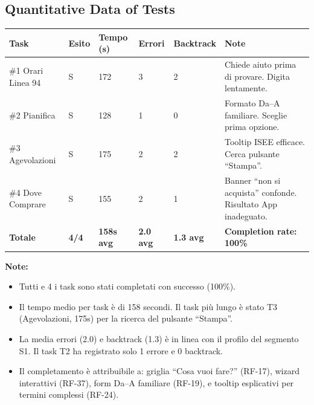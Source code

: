 \documentclass[11pt,a4paper]{article}
\begin{document}
\vspace{0.3cm}

\subsection{Quantitative Data of Tests}

\begin{tcolorbox}[colback=backgroundColor,colframe=borderColor,arc=2mm]
\small

\renewcommand{\arraystretch}{1.3}
\begin{tabular}{|L{1.5cm}|C{1.5cm}|C{1.5cm}|C{1.5cm}|C{1.5cm}|C{3.5cm}|}
\hline
{}
\textbf{Task} & \textbf{Esito} & \textbf{Tempo (s)} & \textbf{Errori} & \textbf{Backtrack} & \textbf{Note} \\
\hline
\#1 Orari Linea 94 & S & 172 & 3 & 2 & Chiede aiuto prima di provare. Digita lentamente. \\
\hline
\#2 Pianifica & S & 128 & 1 & 0 & Formato Da--A familiare. Sceglie prima opzione. \\
\hline
\#3 Agevolazioni & S & 175 & 2 & 2 & Tooltip ISEE efficace. Cerca pulsante ``Stampa''. \\
\hline
\#4 Dove Comprare & S & 155 & 2 & 1 & Banner ``non si acquista'' confonde. Risultato App inadeguato. \\
\hline
{}
\textbf{Totale} & \textbf{4/4} & \textbf{158s avg} & \textbf{2.0 avg} & \textbf{1.3 avg} & \textbf{Completion rate: 100\%} \\
\hline
\end{tabular}

\vspace{0.3cm}
\noindent\textbf{Note:}
\begin{itemize}
  \item Tutti e 4 i task sono stati completati con successo (100\%).
  \item Il tempo medio per task \`e di 158 secondi. Il task pi\`u lungo \`e stato T3 (Agevolazioni, 175s) per la ricerca del pulsante ``Stampa''.
  \item La media errori (2.0) e backtrack (1.3) \`e in linea con il profilo del segmento S1. Il task T2 ha registrato solo 1 errore e 0 backtrack.
  \item Il completamento \`e attribuibile a: griglia ``Cosa vuoi fare?'' (RF-17), wizard interattivi (RF-37), form Da--A familiare (RF-19), e tooltip esplicativi per termini complessi (RF-24).
\end{itemize}

\end{tcolorbox}
\end{document}
